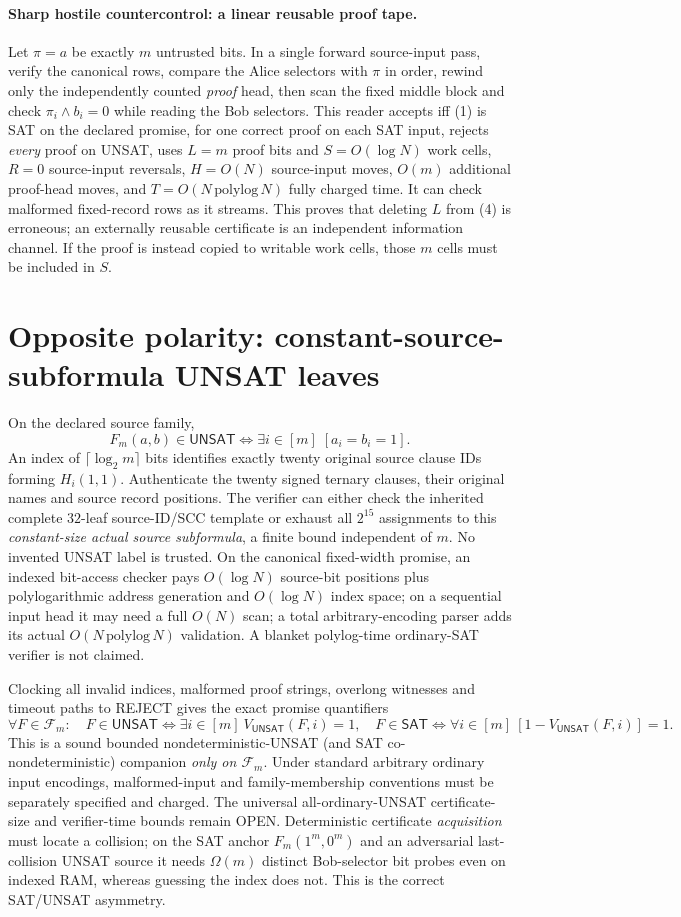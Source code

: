 \documentclass[11pt]{article}
\newcommand{\SAT}{\mathsf{SAT}}
\newcommand{\UNSAT}{\mathsf{UNSAT}}
\begin{document}
\paragraph{Sharp hostile countercontrol: a linear reusable proof tape.}
Let $\pi=a$ be exactly $m$ untrusted bits. In a single forward source-input pass, verify the canonical rows, compare the Alice selectors with $\pi$ in order, rewind only the independently counted \emph{proof} head, then scan the fixed middle block and check $\pi_i\land b_i=0$ while reading the Bob selectors. This reader accepts iff (1) is SAT on the declared promise, for one correct proof on each SAT input, rejects \emph{every} proof on UNSAT, uses $L=m$ proof bits and $S=O(\log N)$ work cells, $R=0$ source-input reversals, $H=O(N)$ source-input moves, $O(m)$ additional proof-head moves, and $T=O(N\,\mathrm{polylog}\,N)$ fully charged time. It can check malformed fixed-record rows as it streams. This proves that deleting $L$ from (4) is erroneous; an externally reusable certificate is an independent information channel. If the proof is instead copied to writable work cells, those $m$ cells must be included in $S$.

\section{Opposite polarity: constant-source-subformula UNSAT leaves}
On the declared source family,
\[
F_m(a,b)\in\UNSAT\iff\exists i\in[m]\;[a_i=b_i=1].\tag{7}
\]
An index of $\lceil\log_2m\rceil$ bits identifies exactly twenty original source clause IDs forming $H_i(1,1)$. Authenticate the twenty signed ternary clauses, their original names and source record positions. The verifier can either check the inherited complete $32$-leaf source-ID/SCC template or exhaust all $2^{15}$ assignments to this \emph{constant-size actual source subformula}, a finite bound independent of $m$. No invented UNSAT label is trusted. On the canonical fixed-width promise, an indexed bit-access checker pays $O(\log N)$ source-bit positions plus polylogarithmic address generation and $O(\log N)$ index space; on a sequential input head it may need a full $O(N)$ scan; a total arbitrary-encoding parser adds its actual $O(N\,\mathrm{polylog}\,N)$ validation. A blanket polylog-time ordinary-SAT verifier is not claimed.

Clocking all invalid indices, malformed proof strings, overlong witnesses and timeout paths to REJECT gives the exact promise quantifiers
\[
\forall F\in\mathcal F_m:\quad
F\in\UNSAT\iff\exists i\in[m]\ V_{\UNSAT}(F,i)=1,
\quad
F\in\SAT\iff\forall i\in[m]\ [1-V_{\UNSAT}(F,i)]=1.\tag{8}
\]
This is a sound bounded nondeterministic-UNSAT (and SAT co-nondeterministic) companion \emph{only on $\mathcal F_m$}. Under standard arbitrary ordinary input encodings, malformed-input and family-membership conventions must be separately specified and charged. The universal all-ordinary-UNSAT certificate-size and verifier-time bounds remain OPEN. Deterministic certificate \emph{acquisition} must locate a collision; on the SAT anchor $F_m(1^m,0^m)$ and an adversarial last-collision UNSAT source it needs $\Omega(m)$ distinct Bob-selector bit probes even on indexed RAM, whereas guessing the index does not. This is the correct SAT/UNSAT asymmetry.
\end{document}
